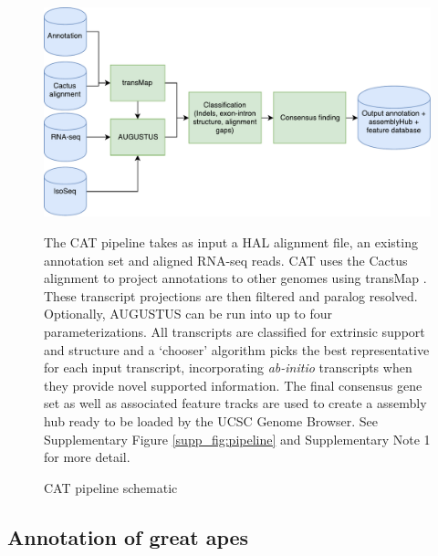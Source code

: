 \documentclass[fleqn,10pt]{wlscirep}
\begin{document}
\begin{figure}
\centering
\includegraphics[width=\textwidth,height=\textheight,keepaspectratio]{pipeline_simplified.pdf}
\caption{CAT pipeline schematic}
The CAT pipeline takes as input a HAL alignment file, an existing annotation set and aligned RNA-seq reads. CAT uses the Cactus alignment to project annotations to other genomes using transMap  \citep{stanke2008using}. These transcript projections are then filtered and paralog resolved. Optionally, AUGUSTUS can be run into up to four parameterizations. All transcripts are classified for extrinsic support and structure and a ‘chooser’ algorithm picks the best representative for each input transcript, incorporating \textit{ab-initio} transcripts when they provide novel supported information. The final consensus gene set as well as associated feature tracks are used to create a assembly hub ready to be loaded by the UCSC Genome Browser. See Supplementary Figure \ref{supp_fig:pipeline} and Supplementary Note 1 for more detail.
\label{fig:pipeline}
\end{figure}

\subsection*{Annotation of great apes}
\end{document}
